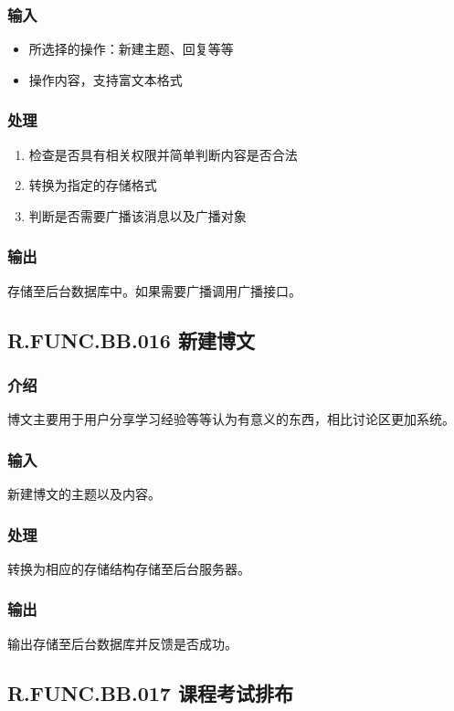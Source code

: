     \subsubsection{输入}
    \begin{itemize}
      \item 所选择的操作：新建主题、回复等等
      \item 操作内容，支持富文本格式
    \end{itemize}
    \subsubsection{处理}
    \begin{enumerate}
      \item 检查是否具有相关权限并简单判断内容是否合法
      \item 转换为指定的存储格式
      \item 判断是否需要广播该消息以及广播对象
    \end{enumerate}
    \subsubsection{输出}
    存储至后台数据库中。如果需要广播调用广播接口。

  \subsection{R.FUNC.BB.016 新建博文}
    \subsubsection{介绍}
    博文主要用于用户分享学习经验等等认为有意义的东西，相比讨论区更加系统。
    \subsubsection{输入}
    新建博文的主题以及内容。
    \subsubsection{处理}
    转换为相应的存储结构存储至后台服务器。
    \subsubsection{输出}
    输出存储至后台数据库并反馈是否成功。

  \subsection{R.FUNC.BB.017 课程考试排布}
